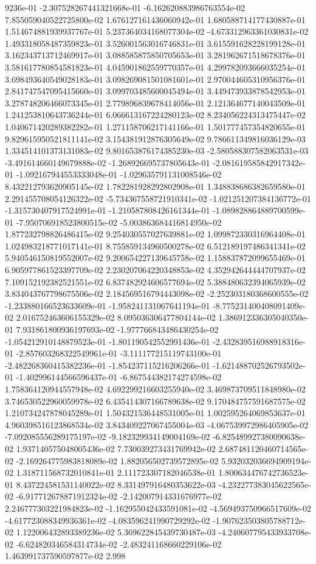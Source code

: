 9236e-01	-2.307528267441321668e-01	-6.162620883986763554e-02	7.855059040522725800e-02	1.676127161436060942e-01	1.680588714177430887e-01	1.514674881939937767e-01	5.237364034168077304e-02	-4.673312963361030831e-02	1.493318058487359823e-01	3.526001563016746831e-01	3.615591628228199128e-01	3.162343713712469917e-01	3.088585875850705653e-01	3.281962671518678376e-01	3.581617780854581823e-01	4.045901862559770357e-01	4.299782093666035254e-01	3.698493640549028183e-01	3.098269081501081601e-01	2.970044605310956376e-01	2.841747547095415660e-01	3.099703485600045494e-01	3.449473933878542953e-01	3.278748206466073345e-01	2.779896839678414056e-01	2.121364677140043509e-01	1.241253810643736244e-01	6.066613167224280123e-02	8.234056224313475447e-02	1.040671420289382282e-01	1.271158706217141166e-01	1.501777457354820655e-01	9.829615950521811141e-02	3.154381912876305649e-02	9.786611349816036129e-03	1.334514101373131083e-02	9.801653876174385230e-03	-2.580588307582063531e-03	-3.491614660149679888e-02	-1.268926695737805643e-01	-2.081619585842917342e-01	-1.092167944553333048e-01	-1.029635791131008546e-02	8.432212793620905145e-02	1.782281928292802908e-01	1.348838686382659580e-01	2.291455708054126322e-02	-5.734367558721910341e-02	-1.021251207384136772e-01	-1.315730407917524991e-01	-1.210587808426161344e-01	-1.089828864889700599e-01	-7.950706918523800515e-02	-5.003863684416814950e-02	1.877232798826486415e-02	9.254030557027639881e-02	1.099872330316964408e-01	1.024983218771017141e-01	8.755859134960500278e-02	6.512189197486341341e-02	5.940546150819552007e-02	9.200654227139645758e-02	1.158837872099655469e-01	6.905977861523397709e-02	2.230207064220348853e-02	4.352942644444707937e-02	7.109152192382521551e-02	6.837482924606577694e-02	5.388480632394065939e-02	3.834043767798675506e-02	2.184569516794443098e-02	-2.252303180368600555e-02	-1.233880166523633609e-01	-1.958241131067641194e-01	-8.775231400408091409e-02	2.016752463606155329e-02	8.095036306477804144e-02	1.386912336305040350e-01	7.931861800936197693e-02	-1.977766843486430254e-02	-1.054212910148879523e-01	-1.801190542552991436e-01	-2.432839516988918316e-01	-2.857603268322549961e-01	-3.111177215119743100e-01	-2.482268360415382236e-01	-1.854237115216206266e-01	-1.621488702526793502e-01	-1.402996144566596437e-01	-6.867544382174274598e-02	1.758364120944557948e-02	4.692299216603255940e-02	3.469873709511848980e-02	3.746530522960059978e-02	6.435414307166789638e-02	9.170484757591687575e-02	1.210734247878045289e-01	1.504321536448531005e-01	1.002595264069853637e-01	4.960398516123868534e-02	3.843409227067455004e-03	-4.067539972986405905e-02	-7.092085556289175197e-02	-9.182329934149004169e-02	-6.825489927380090638e-02	1.937140575048005436e-02	7.730039273431769942e-02	2.687481120460714565e-02	-2.169264775983818089e-02	1.882056502739572895e-02	5.932032036694909194e-02	1.318711568732010841e-01	2.111723307182046538e-01	1.800634476742736523e-01	8.437224581531140022e-02	8.331497916480353622e-03	-4.232277383045622565e-02	-6.917712678871912324e-02	-2.142007914331676977e-02	2.246777303221984823e-02	-1.162955042433591081e-02	-4.569493750966517609e-02	-4.617723088349936361e-02	-4.083596241990729292e-02	-1.907623503805788712e-02	1.122006432893389236e-02	5.369622845439730487e-03	-4.240607795433933708e-02	-6.624820346584314734e-02	-2.483241168660229106e-02	1.463991737590597877e-02	2.998